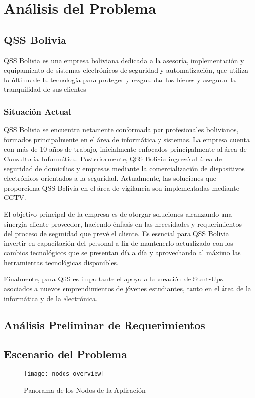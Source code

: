 \chapter{Análisis del Problema}
    \section{QSS Bolivia}
        QSS Bolivia es una empresa boliviana dedicada a la asesoría, implementación y equipamiento de sistemas electrónicos de seguridad y automatización, que utiliza lo último de la tecnología para proteger y resguardar los bienes y asegurar la tranquilidad de sus clientes \parencite{QSSBolvia2016-el}
        \subsection{Situación Actual}
            QSS Bolivia se encuentra netamente conformada por profesionales bolivianos, formados principalmente en el área de informática y sistemas. La empresa cuenta con más de 10 años de trabajo, inicialmente enfocados principalmente al área de Consultoría Informática. Posteriormente, QSS Bolivia ingresó al área de seguridad de domicilios y empresas mediante la comercialización de dispositivos electrónicos orientados a la seguridad.
            Actualmente, las soluciones que proporciona QSS Bolivia en el área de vigilancia son implementadas mediante CCTV.
            
            El objetivo principal de la empresa es de otorgar soluciones alcanzando una sinergia cliente-proveedor, haciendo énfasis en las necesidades y requerimientos del proceso de seguridad que prevé el cliente.  
            Es esencial para QSS Bolivia invertir en capacitación del personal a fin de mantenerlo actualizado con los cambios tecnológicos que se presentan día a día y aprovechando al máximo las herramientas tecnológicas disponibles. 
            
            Finalmente, para QSS es importante el apoyo a la creación de Start-Ups asociados a nuevos emprendimientos de jóvenes estudiantes, tanto en el área de la informática y de la electrónica.
    \section{Análisis Preliminar de Requerimientos}
    \section{Escenario del Problema}
        \begin{figure}[H]
            \centering
            \texttt{[image: nodos-overview]}
            \caption{Panorama de los Nodos de la Aplicación}
            \label{fig:nodos-overview}
        \end{figure}
    
